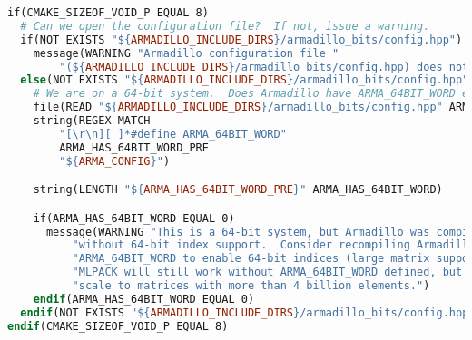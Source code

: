\documentclass[11pt]{article}
\begin{document}
\begin{lstlisting}[language=make,label=lst:10lst,caption=Package Evaluation]
if(CMAKE_SIZEOF_VOID_P EQUAL 8)
  # Can we open the configuration file?  If not, issue a warning.
  if(NOT EXISTS "${ARMADILLO_INCLUDE_DIRS}/armadillo_bits/config.hpp")
    message(WARNING "Armadillo configuration file "
        "(${ARMADILLO_INCLUDE_DIRS}/armadillo_bits/config.hpp) does not exist!")
  else(NOT EXISTS "${ARMADILLO_INCLUDE_DIRS}/armadillo_bits/config.hpp")
    # We are on a 64-bit system.  Does Armadillo have ARMA_64BIT_WORD enabled?
    file(READ "${ARMADILLO_INCLUDE_DIRS}/armadillo_bits/config.hpp" ARMA_CONFIG)
    string(REGEX MATCH
        "[\r\n][ ]*#define ARMA_64BIT_WORD"
        ARMA_HAS_64BIT_WORD_PRE
        "${ARMA_CONFIG}")

    string(LENGTH "${ARMA_HAS_64BIT_WORD_PRE}" ARMA_HAS_64BIT_WORD)

    if(ARMA_HAS_64BIT_WORD EQUAL 0)
      message(WARNING "This is a 64-bit system, but Armadillo was compiled "
          "without 64-bit index support.  Consider recompiling Armadillo with "
          "ARMA_64BIT_WORD to enable 64-bit indices (large matrix support). "
          "MLPACK will still work without ARMA_64BIT_WORD defined, but will not "
          "scale to matrices with more than 4 billion elements.")
    endif(ARMA_HAS_64BIT_WORD EQUAL 0)
  endif(NOT EXISTS "${ARMADILLO_INCLUDE_DIRS}/armadillo_bits/config.hpp")
endif(CMAKE_SIZEOF_VOID_P EQUAL 8)
\end{lstlisting}





\end{document}
